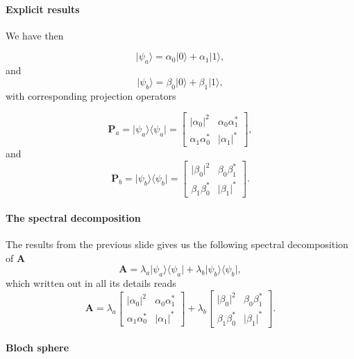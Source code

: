 \paragraph{Explicit results}

We have then

\[
\vert \psi_a\rangle = \alpha_0\vert 0\rangle+\alpha_1\vert 1\rangle,
\]
and
\[
\vert \psi_b\rangle = \beta_0\vert 0\rangle+\beta_1\vert 1\rangle,
\]
with corresponding projection operators

\[
\bm{P}_a=\vert \psi_a\rangle \langle \psi_a\vert = \begin{bmatrix} \vert \alpha_0\vert^2 &\alpha_0\alpha_1^* \\
                                                                   \alpha_1\alpha_0^* & \vert \alpha_1\vert^* \end{bmatrix},
\]    
and
\[
\bm{P}_b=\vert \psi_b\rangle \langle \psi_b\vert = \begin{bmatrix} \vert \beta_0\vert^2 &\beta_0\beta_1^* \\
                                                                   \beta_1\beta_0^* & \vert \beta_1\vert^* \end{bmatrix}.
\]


\paragraph{The spectral decomposition}

The results from the previous slide gives us
the following spectral decomposition of $\bm{A}$
\[
\bm{A}=\lambda_a \vert \psi_a\rangle \langle \psi_a\vert+\lambda_b \vert \psi_b\rangle \langle \psi_b\vert,
\]
which written out in all its details reads
\[
\bm{A}=\lambda_a\begin{bmatrix} \vert \alpha_0\vert^2 &\alpha_0\alpha_1^* \\
                                                                   \alpha_1\alpha_0^* & \vert \alpha_1\vert^* \end{bmatrix} +\lambda_b\begin{bmatrix} \vert \beta_0\vert^2 &\beta_0\beta_1^* \\
                                                                   \beta_1\beta_0^* & \vert \beta_1\vert^* \end{bmatrix}.
\]


\paragraph{Bloch sphere}

